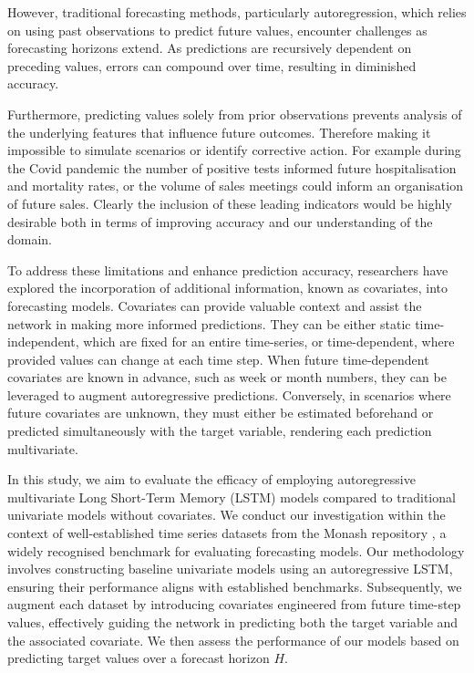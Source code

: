 \documentclass[letterpaper]{article}
\newcommand{\horizon}{H}
\begin{document}
However, traditional forecasting methods, particularly autoregression, which relies on using past observations to 
predict future values, encounter challenges as forecasting horizons extend. As predictions are recursively 
dependent on preceding values, errors can compound over time, resulting in diminished accuracy.

Furthermore, predicting values solely from prior observations prevents analysis of the underlying features that influence future 
outcomes. Therefore making it impossible to simulate scenarios or identify corrective action. For example during the Covid 
pandemic the number of positive tests informed future hospitalisation and mortality rates, or the volume of sales 
meetings could inform an organisation of future sales.  Clearly the inclusion of these leading indicators would be highly desirable 
both in terms of improving accuracy and our understanding of the domain.

To address these limitations and enhance prediction accuracy, researchers have explored the incorporation of 
additional information, known as covariates, into forecasting models. Covariates can provide valuable context 
and assist the network in making more informed predictions. They can be either static time-independent, which are fixed 
for an entire time-series, or time-dependent, where provided values can change at each time step. 
When future time-dependent covariates are known in advance, such as week or month numbers, they can be 
leveraged to augment autoregressive predictions. Conversely, in scenarios where future covariates are unknown, 
they must either be estimated beforehand or predicted simultaneously with the target variable, rendering each 
prediction multivariate.

In this study, we aim to evaluate the efficacy of employing autoregressive multivariate Long Short-Term Memory 
(LSTM) \cite{HochSchm97} models compared to traditional univariate models without covariates. We conduct our investigation 
within the context of well-established time series datasets from the Monash repository \cite{DBLP:conf/nips/GodahewaBWHM21}, 
a widely recognised benchmark for evaluating forecasting models. Our methodology involves constructing baseline univariate models 
using an autoregressive LSTM, ensuring their performance aligns with established benchmarks. Subsequently, we 
augment each dataset by introducing covariates engineered from future time-step values, effectively guiding 
the network in predicting both the target variable and the associated covariate. We then assess the performance 
of our models based on predicting target values over a forecast horizon $\horizon$.
\end{document}
